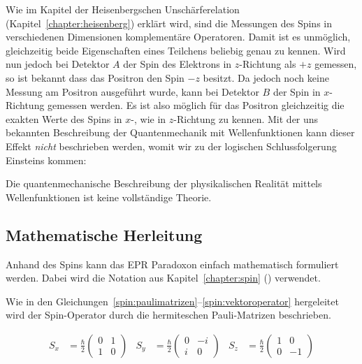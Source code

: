 \begin{refsection}
Wie im Kapitel der Heisenbergschen Unsch\"arferelation 
(Kapitel~\ref{chapter:heisenberg})
erkl\"art wird, sind die Messungen des Spins in verschiedenen Dimensionen 
komplement\"are Operatoren.
Damit ist es unm\"oglich, gleichzeitig beide Eigenschaften eines Teilchens
beliebig genau zu kennen.
Wird nun jedoch bei Detektor $A$ der Spin des Elektrons in $z$-Richtung 
als $+z$ gemessen, so ist bekannt dass das Positron den Spin $-z$ besitzt.
Da jedoch noch keine Messung am Positron ausgef\"uhrt wurde, kann bei
Detektor $B$ der Spin in $x$-Richtung gemessen werden.
Es ist also m\"oglich f\"ur das Positron gleichzeitig die exakten Werte 
des Spins in $x$-, wie in $z$-Richtung zu kennen. 
Mit der uns bekannten Beschreibung der Quantenmechanik mit Wellenfunktionen
kann dieser Effekt \emph{nicht} beschrieben werden, womit wir zu der
logischen Schlussfolgerung Einsteins kommen:

\begin{satz}
    Die quantenmechanische Beschreibung der physikalischen Realit\"at mittels
    Wellenfunktionen ist keine vollst\"andige Theorie.
\end{satz}

\subsection{Mathematische Herleitung\label{subsection:bell:epr:herleitung}}
Anhand des Spins kann das EPR Paradoxon einfach mathematisch formuliert werden.
Dabei wird die Notation aus Kapitel~\ref{chapter:spin} ()
verwendet.

Wie in den Gleichungen~\ref{spin:paulimatrizen}--\ref{spin:vektoroperator}
hergeleitet wird der Spin-Operator durch die hermiteschen Pauli-Matrizen
beschrieben.

\begin{align}
    S_x &= \frac{\hbar}{2} \begin{pmatrix}
    0 & 1 \\ 1 & 0
    \end{pmatrix}
    &
    S_y &= \frac{\hbar}{2} \begin{pmatrix}
    0 & -i \\ i & 0
    \end{pmatrix}
    &
    S_z &= \frac{\hbar}{2} \begin{pmatrix}
    1 & 0 \\ 0 & -1
    \end{pmatrix}\label{equ:bell:paulimatrizen}
\end{align}


\end{refsection}
